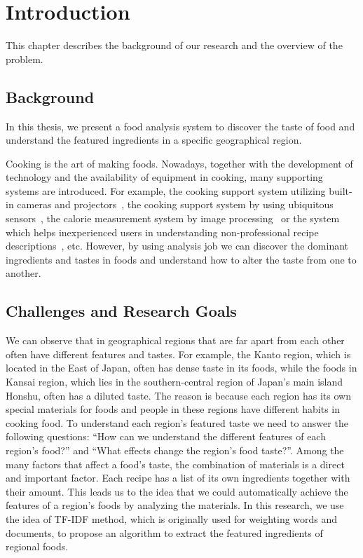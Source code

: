 \chapter{Introduction}\label{chap:intro}
This chapter describes the background of our research and the overview of the problem.

\clearpage
\section{Background}\label{sec:intro_background}

In this thesis, we present a food analysis system to discover the taste of food and understand the featured ingredients in a specific geographical region.
\par Cooking is the art of making foods. Nowadays, together with the development of technology and the availability of equipment in cooking, many supporting systems are introduced. For example, the cooking support system utilizing built-in cameras and projectors~\cite{morioka:camera-projecter}, the cooking support system by using ubiquitous sensors~\cite{nakauchi:recog}, the calorie measurement system by image processing~\cite{villalobos:image-calorie} or the system which helps inexperienced users in understanding non-professional recipe descriptions~\cite{ide:inexper}, etc. However, by using analysis job we can discover the dominant ingredients and tastes in foods and understand how to alter the taste from one to another.


\section{Challenges and Research Goals}\label{sec:challenge}

\par We can observe that in geographical regions that are far apart from each other often have different features and tastes. For example, the Kanto region, which is located in the East of Japan, often has dense taste in its foods, while the foods in Kansai region, which lies in the southern-central region of Japan's main island Honshu, often has a diluted taste. The reason is because each region has its own special materials for foods and people in these regions have different habits in cooking food. To understand each region's featured taste we need to answer the following questions: ``How can we understand the different features of each region's food?'' and ``What effects change the region's food taste?''. Among the many factors that affect a food's taste, the combination of materials is a direct and important factor. Each recipe has a list of its own ingredients together with their amount. This leads us to the idea that we could automatically achieve the features of a region's foods by analyzing the materials. In this research, we use the idea of TF-IDF method, which is originally used for weighting words and documents, to propose an algorithm to extract the featured ingredients of regional foods.  

